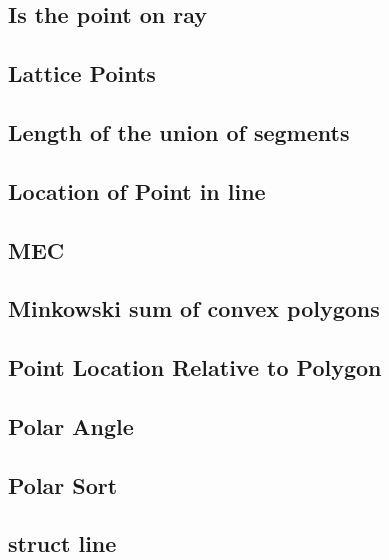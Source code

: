 ﻿\documentclass[10pt,twocolumn]{article}
\newcommand{\codefile}[1]{}}
\begin{document}
\subsection{Is the point on ray}
\codefile{Geometry/Is the point on ray.cpp}

\subsection{Lattice Points}
\codefile{Geometry/Lattice Points.cpp}

\subsection{Length of the union of segments}
\codefile{Geometry/Length of the union of segments.cpp}

\subsection{Location of Point in line}
\codefile{Geometry/Location of Point in line.cpp}

\subsection{MEC}
\codefile{Geometry/MEC.cpp}

\subsection{Minkowski sum of convex polygons}
\codefile{Geometry/Minkowski sum of convex polygons.cpp}

\subsection{Point Location Relative to Polygon}
\codefile{Geometry/Point Location Relative to Polygon.cpp}

\subsection{Polar Angle}
\codefile{Geometry/Polar Angle.cpp}

\subsection{Polar Sort}
\codefile{Geometry/Polar Sort.cpp}

\subsection{struct line}
\codefile{Geometry/struct line.cpp}
\end{document}
